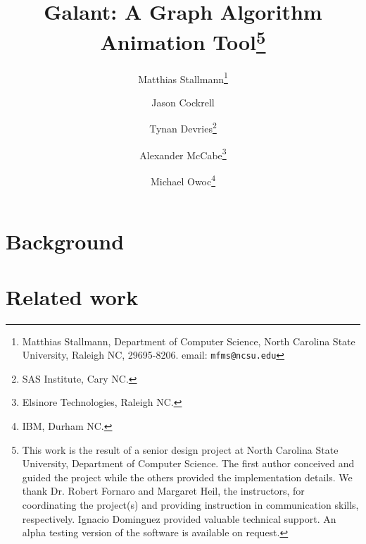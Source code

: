 \documentclass{article}
\begin{document}
\title{Galant: A Graph Algorithm Animation Tool\thanks{
    This work is the result of a senior design project at North Carolina
    State University, Department of Computer Science.
    The first author conceived and guided the project while the others
    provided the implementation details.
    We thank Dr. Robert Fornaro and Margaret Heil, the instructors, for
    coordinating the project(s) and providing instruction in communication
    skills, respectively. Ignacio Dominguez provided valuable technical
    support.
    An alpha testing version of the software is available on request.
  }
}
\author{Matthias Stallmann\thanks{Matthias Stallmann, Department of Computer
    Science, North Carolina State University, Raleigh NC, 29695-8206.
    email: \texttt{mfms@ncsu.edu}}
  \and Jason Cockrell
  \and Tynan Devries\thanks{SAS Institute, Cary NC.}
  \and Alexander McCabe\thanks{Elsinore Technologies, Raleigh NC.}
  \and Michael Owoc\thanks{IBM, Durham NC.}
}

\maketitle

\begin{abstract}



\end{abstract}

\section{Background}



\section{Related work}






\end{document}

